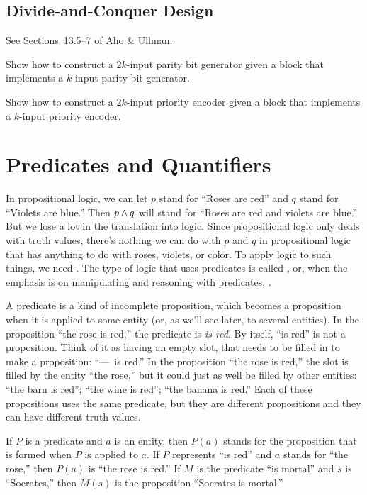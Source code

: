 \subsection{Divide-and-Conquer Design}
See Sections~13.5--7 of Aho \& Ullman.

\begin{exercises}
\problem Show how to construct a $2k$-input parity bit generator given a block that implements a $k$-input parity bit generator.

\problem Show how to construct a $2k$-input priority encoder given a block that implements a $k$-input priority encoder.

\end{exercises}



\section{Predicates and Quantifiers}\label{S-logic-4}

In propositional logic, we can let $p$ stand for ``Roses are red'' and
$q$ stand for ``Violets are blue.''  Then $p\wedge q$ will stand for
``Roses are red and violets are blue.''  But we lose a lot in the
translation into logic.  Since propositional logic only deals with
truth values, there's nothing we can do with $p$ and $q$ in propositional
logic that has anything to do with roses, violets, or color.
To apply logic to such things, we need .
The type of logic that uses predicates is called , or, when the emphasis is on manipulating and reasoning
with predicates, .

A predicate is a kind of incomplete proposition, which becomes
a proposition when it is applied to some entity (or, as we'll see later,
to several entities).  In the proposition ``the rose is red,'' the
predicate is \emph{is red}.  By itself, ``is red'' is not a proposition.
Think of it as having an empty slot, that needs to be filled in
to make a proposition: ``---~is red.''  In the proposition
``the rose is red,'' the slot is filled by the entity ``the rose,''
but it could just as well be filled by other entities:
``the barn is red''; ``the wine is red''; ``the banana is red.''
Each of these propositions uses the same predicate, but they are
different propositions and they can have different truth values.

If $P$ is a predicate and $a$ is an entity, then $P(a)$ stands for
the proposition that is formed when $P$ is applied to $a$.  If $P$
represents ``is red'' and $a$ stands for ``the rose,'' then
$P(a)$ is ``the rose is red.''  If $M$ is the predicate
``is mortal'' and $s$ is ``Socrates,'' then $M(s)$ is the proposition
``Socrates is mortal.'' 

